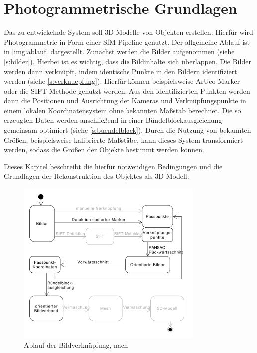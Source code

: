 \documentclass[./00PhotoBox.tex]{subfiles}
\begin{document}
\chapter{Photogrammetrische Grundlagen}
\label{c:photogrammetrie}
Das zu entwickelnde System soll 3D-Modelle von Objekten erstellen. Hierfür wird Photogrammetrie in Form einer \gls{SfM}-Pipeline genutzt.
Der allgemeine Ablauf ist in \autoref{img:ablauf} dargestellt. Zunächst werden die Bilder aufgenommen (siehe \autoref{s:bilder}). Hierbei ist es wichtig, dass die Bildinhalte sich überlappen.
Die Bilder werden dann verknüpft, indem identische Punkte in den Bildern identifiziert werden  (siehe \autoref{s:verknuepfung}). Hierfür können beispielsweise ArUco-Marker oder die SIFT-Methode genutzt werden.
Aus den identifizierten Punkten werden dann die Positionen und Ausrichtung der Kameras und Verknüpfungspunkte in einem lokalen Koordinatensystem ohne bekannten Maßstab berechnet. Die so erzeugten Daten werden anschließend in einer Bündelblockausgleichung gemeinsam optimiert (siehe \autoref{s:buendelblock}). Durch die Nutzung von bekannten Größen, beispielsweise kalibrierte Maßstäbe, kann dieses System transformiert werden, sodass die Größen der Objekte bestimmt werden können.

Dieses Kapitel beschreibt die hierfür notwendigen Bedingungen und die Grundlagen der Rekonstruktion des Objektes als 3D-Modell.

\begin{figure}
    \centering
    \includegraphics[width=0.8\textwidth]{./img/uml/uml_ablauf.pdf}
    \caption{Ablauf der Bildverknüpfung, nach \citealt[S. 492]{luhmann}} %
    \label{img:ablauf} %
\end{figure}
\end{document}

